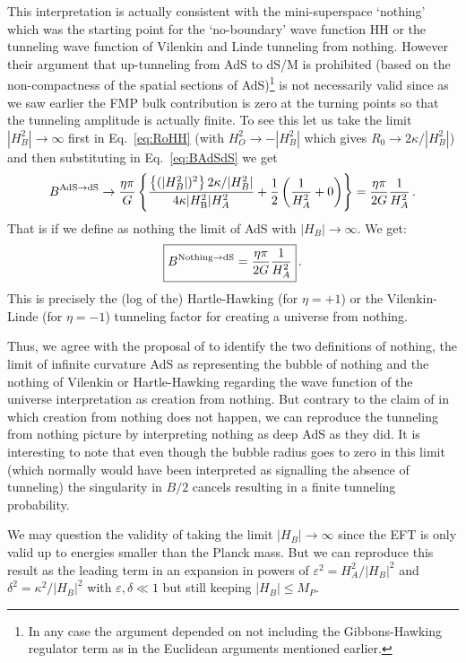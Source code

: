 \documentclass[a4paper,11pt]{article}
\numberwithin{equation}{section}
\newcommand{\citep}{\cite}
\newcommand{\be}{\begin{equation}}
\newcommand{\ee}{\end{equation}}
\numberwithin{equation}{section}
\begin{document}
This interpretation is actually
consistent with the mini-superspace ‘nothing’ which was the starting
point for the ‘no-boundary’ wave function HH or the tunneling wave
function of Vilenkin and Linde tunneling from nothing. However their
argument that up-tunneling from AdS to dS/M is prohibited (based on
the non-compactness of the spatial sections of AdS)\footnote{In any case the argument depended on not including the Gibbons-Hawking regulator term as in the Euclidean arguments mentioned earlier.} is not necessarily valid since
as we saw earlier the FMP bulk contribution is zero at the turning
points so that the tunneling amplitude is actually finite. To see
this let us take the limit $|H_{B}^{2}|\rightarrow\infty$ first in Eq.~\eqref{eq:RoHH} (with $H_{O}^{2}\rightarrow-|H_{B}^{2}|$ which
gives $R_{0}\rightarrow2\kappa/|H_{B}^{2}|$) and then substituting
in Eq.~\eqref{eq:BAdSdS} we get
\[
B^{{\rm AdS \rightarrow dS}}\rightarrow\frac{\eta\pi}{G}\left\{ \frac{\left\{ (|H_{B}^{2}|)^{2}\right\} 2\kappa/|H_{B}^{2}|}{4\kappa|H_{{\rm B}}^{2}|H_{A}^{2}}+\frac{1}{2}\left(\frac{1}{H_{A}^{2}}+0\right)\right\} =\frac{\eta\pi}{2G}\frac{1}{H_{A}^{2}} \,.
\]
 That is if we define as nothing the limit of AdS with $|H_B|\rightarrow \infty$. We get:
 \be
 \boxed{B^{{\rm Nothing \rightarrow dS}}=\frac{\eta\pi}{2G}\frac{1}{H_{A}^{2}}} \,.
 \label{eq:nothingrate}
 \ee
This is precisely the (log of the) Hartle-Hawking (for $\eta=+1$) or the Vilenkin-Linde (for $\eta=-1$) tunneling factor for creating a universe from nothing.

Thus, we agree with the proposal of \citep{Brown:2011gt} to identify the two definitions of nothing, the limit of infinite curvature AdS as representing the bubble of nothing and the nothing of Vilenkin or Hartle-Hawking regarding the wave function of the universe interpretation as creation from nothing. But contrary to the claim of \citep{Brown:2011gt} in which creation from nothing does not happen,  we can reproduce
the tunneling from nothing picture  by interpreting nothing
as deep AdS as they did. It is interesting to note that even though
the bubble radius goes to zero in this limit (which normally would
have been interpreted as signalling the absence of tunneling) the singularity in $B/2$ cancels resulting in a finite tunneling probability.

We may question the validity of taking the limit $|H_B|\rightarrow \infty $ since the EFT is only valid up to energies smaller than the Planck mass. But we can reproduce this result as the leading term in an expansion in powers of $\varepsilon^2=H_A^2/|H_B|^2$ and $\delta^2=\kappa^2/|H_B|^2$ with $\varepsilon,\delta \ll 1$ but still keeping $|H_B|\leq M_P$.
\end{document}
